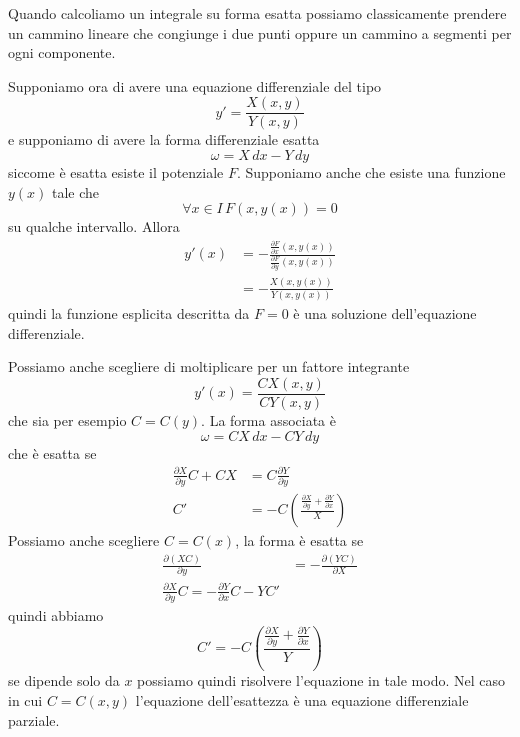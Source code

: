 \documentclass[a4paper]{article}
\begin{document}
Quando calcoliamo un integrale su forma esatta possiamo classicamente prendere un cammino
lineare che congiunge i due punti oppure un cammino a segmenti per ogni componente.

\begin{snippetproposition}{}
    Supponiamo ora di avere una equazione differenziale del tipo
    \[
        y' = \frac{X(x,y)}{Y(x,y)}
    \]
    e supponiamo di avere la forma differenziale esatta
    \[
        \omega = X\,dx - Y\,dy
    \]
    siccome è esatta esiste il potenziale \(F\).
    Supponiamo anche che esiste una funzione \(y(x)\) tale che
    \[
        \forall x\in I \, F(x, y(x)) = 0
    \]
    su qualche intervallo.
    Allora
    \begin{align*}
        y'(x) &= - \frac{
            \frac{\partial F}{\partial x}(x,y(x))
        }{
            \frac{\partial F}{\partial y}(x,y(x))
        } \\
        &= - \frac{X(x,y(x))}{Y(x,y(x))}
    \end{align*}
    quindi la funzione esplicita descritta da \(F = 0\) è una soluzione dell'equazione differenziale.

    Possiamo anche scegliere di moltiplicare per un fattore integrante
    \[
        y'(x) = \frac{CX(x,y)}{CY(x,y)}
    \]
    che sia per esempio \(C = C(y)\). La forma associata è
    \[
        \omega = CX\,dx - CY\,dy
    \]
    che è esatta se
    \begin{align*}
        \frac{\partial X}{\partial y}C + CX &= C \frac{\partial Y}{\partial y} \\
        C' &= -C \left(
            \frac{\frac{\partial X}{\partial y} + \frac{\partial Y}{\partial x}}{X}
        \right)
    \end{align*}
    Possiamo anche scegliere \(C = C(x)\), la forma è esatta se
    \begin{align*}
        \frac{\partial (XC)}{\partial y} &= -\frac{\partial (YC)}{\partial X} \\
        \frac{\partial X}{\partial y}C = -\frac{\partial Y}{\partial x} C - YC'
    \end{align*}
    quindi abbiamo
    \[
        C' = -C \left(
            \frac{\frac{\partial X}{\partial y} + \frac{\partial Y}{\partial x}}{Y}
        \right)
    \]
    se dipende solo da \(x\) possiamo quindi risolvere l'equazione in tale modo.
    Nel caso in cui \(C=C(x,y)\) l'equazione dell'esattezza è una equazione differenziale parziale.
\end{snippetproposition}
\end{document}
